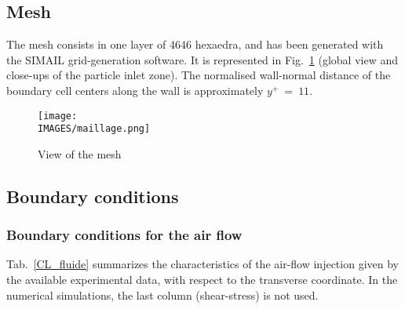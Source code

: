 \subsection{Mesh}


The mesh consists in one layer of 4646 hexaedra, and has been generated with the SIMAIL grid-generation software. It is represented in Fig.~\ref{mailla_jetpar} (global view and close-ups of the particle inlet zone). The normalised wall-normal distance of the boundary cell centers along the wall is approximately  ${y^+}~=~11$.

\begin{figure}[H]
\centerline{\texttt{[image: \\IMAGES/maillage.png]}}
\caption{\label{mailla_jetpar}{View of the mesh}}
\end{figure}

\newpage
\subsection{Boundary conditions}






\subsubsection{Boundary conditions for the air flow}

Tab.~\ref{CL_fluide} summarizes the characteristics of the air-flow injection given by the available experimental data, with respect to the transverse coordinate. In the numerical simulations, the last column (shear-stress) is not used.

